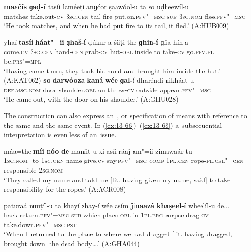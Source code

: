\ex
\label{ex:13-63}
\gll \textbf{maačís} \textbf{ɡaḍ-í} tasíi laméeṭi anɡóor ṣaawóol-u ta so uḍheewíl-u \\
matches take.out-\textsc{cv} \textsc{3sg.gen} tail fire put.on.\textsc{pfv"=msg}  \textsc{sub } \textsc{3sg.nom} flee.\textsc{pfv"=msg} \\
\glt `He took matches, and when he had put fire to its tail, it fled.' (A:HUB009)

\ex
\label{ex:13-64}
\gll yhaí \textbf{tasíi} \textbf{háat"=ii} \textbf{ɡhaš-í} ḍúkur-a šíiṭi the \textbf{ɡhin-í} ɡíia hín-a  \\
come.\textsc{cv} \textsc{3sg.gen} hand-\textsc{gen} grab-\textsc{cv} hut-\textsc{obl} inside to  take-\textsc{cv} go.\textsc{pfv.pl} be.\textsc{prs"=mpl} \\
\glt `Having come there, they took his hand and brought him inside the hut.' (A:KAT062)
\ex
\label{ex:13-65}
\gll \textbf{so} \textbf{darwóoza} \textbf{kaná} \textbf{wée} \textbf{ɡal-í} dharéndi nikháat-u\\
\textsc{def.msg.nom} door shoulder.\textsc{obl} on throw-\textsc{cv} outside appear.\textsc{pfv"=msg}\\
\glt `He came out, with the door on his shoulder.' (A:GHU028) 
\z

 The  construction can also express an~, or specification of means with reference to the same  and the same event. In (\ref{ex:13-66})--(\ref{ex:13-68}) a~subsequential interpretation is even less of an~issue.

\ea
\label{ex:13-66}
\gll máa=the \textbf{míi} \textbf{nóo} \textbf{de} maníit-u ki asíi ráaǰ-am"=ii zimawaár tu  \\
\textsc{1sg.nom}=to \textsc{1sg.gen} name give.\textsc{cv} say.\textsc{pfv"=msg} \textsc{comp}  \textsc{1pl.gen} rope-\textsc{pl.obl"=gen} responsible \textsc{2sg.nom}  \\
\glt `They called my name and told me [lit: having given my name, said] to take responsibility for the ropes.' (A:ACR008)

\ex
\label{ex:13-67}
\gll paturaá nuuṭíl-u ta khayí zhay-í wée asím \textbf{ǰinaazá} \textbf{khaṣeel-í} wheelíl-u de... \\
back return.\textsc{pfv"=msg} \textsc{sub} which place-\textsc{obl} in \textsc{1pl.erg}  corpse drag-\textsc{cv} take.down.\textsc{pfv"=msg} \textsc{pst} \\
\glt `When I returned to the place to where we had dragged [lit: having dragged, brought down] the dead body{\ldots}.' (A:GHA044)

